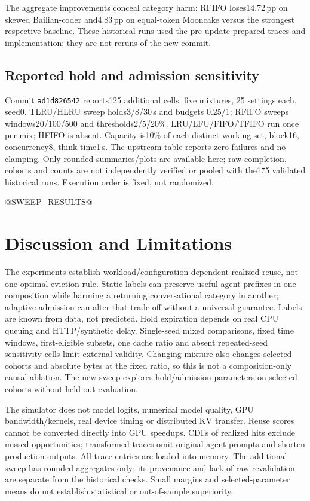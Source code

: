 \documentclass{article}
\begin{document}
The aggregate improvements conceal category harm: RFIFO loses14.72\,pp on skewed Bailian-coder and4.83\,pp on equal-token Mooncake versus the strongest respective baseline. These historical runs used the pre-update prepared traces and implementation; they are not reruns of the new commit.

\subsection{Reported hold and admission sensitivity}
Commit \texttt{ad1d826542} reports125 additional cells: five mixtures, 25 settings each, seed0. TLRU/HLRU sweep holds3/8/30\,s and budgets 0.25/1; RFIFO sweeps windows20/100/500 and thresholds2/5/20\%. LRU/LFU/FIFO/TFIFO run once per mix; HFIFO is absent. Capacity is10\% of each distinct working set, block16, concurrency8, think time1\,s. The upstream table reports zero failures and no clamping. Only rounded summaries/plots are available here; raw completion, cohorts and counts are not independently verified or pooled with the175 validated historical runs. Execution order is fixed, not randomized.

@SWEEP_RESULTS@



\section{Discussion and Limitations}
The experiments establish workload/configuration-dependent realized reuse, not one optimal eviction rule. Static labels can preserve useful agent prefixes in one composition while harming a returning conversational category in another; adaptive admission can alter that trade-off without a universal guarantee. Labels are known from data, not predicted. Hold expiration depends on real CPU queuing and HTTP/synthetic delay. Single-seed mixed comparisons, fixed time windows, first-eligible subsets, one cache ratio and absent repeated-seed sensitivity cells limit external validity. Changing mixture also changes selected cohorts and absolute bytes at the fixed ratio, so this is not a composition-only causal ablation. The new sweep explores hold/admission parameters on selected cohorts without held-out evaluation.

The simulator does not model logits, numerical model quality, GPU bandwidth/kernels, real device timing or distributed KV transfer. Reuse scores cannot be converted directly into GPU speedups. CDFs of realized hits exclude missed opportunities; transformed traces omit original agent prompts and shorten production outputs. All trace entries are loaded into memory. The additional sweep has rounded aggregates only; its provenance and lack of raw revalidation are separate from the historical checks. Small margins and selected-parameter means do not establish statistical or out-of-sample superiority.
\end{document}
